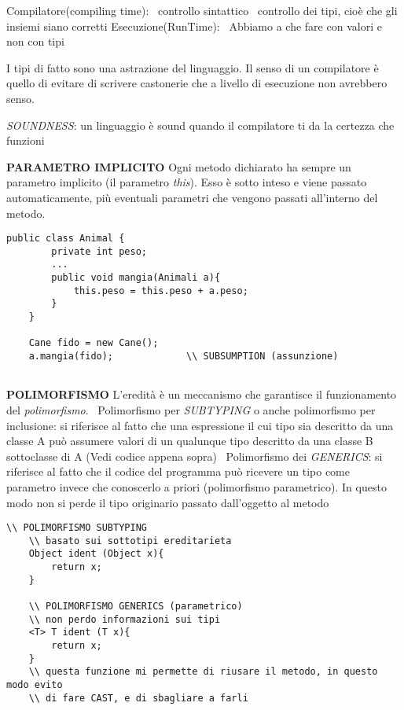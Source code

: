 \noindent Compilatore(compiling time): \newline
\textbullet\ controllo sintattico \newline
\textbullet\ controllo dei tipi, cioè che gli insiemi siano corretti \newline
Esecuzione(RunTime):\newline
\textbullet\ Abbiamo a che fare con valori e non con tipi

\noindent I tipi di fatto sono una astrazione del linguaggio. \newline
Il senso di un compilatore è quello di evitare di scrivere castonerie che a livello di esecuzione non avrebbero senso.

\noindent \textit{SOUNDNESS}: un linguaggio è sound quando il compilatore ti da la certezza che funzioni

\noindent \textbf{PARAMETRO IMPLICITO} \newline
 Ogni metodo dichiarato ha sempre un parametro implicito (il parametro \textit{this}). Esso è sotto inteso e viene passato automaticamente, più eventuali parametri che vengono passati all'interno del metodo.
\begin{lstlisting}[basicstyle=\small,]
	public class Animal {
		private int peso;
		...
		public void mangia(Animali a){
			this.peso = this.peso + a.peso;
		}
	}
	
	Cane fido = new Cane();
	a.mangia(fido); 			\\ SUBSUMPTION (assunzione)	
	
\end{lstlisting}

\noindent \textbf{POLIMORFISMO} \newline
L'eredità è un meccanismo che garantisce il funzionamento del \textit{polimorfismo}.\newline
\textbullet\ Polimorfismo per \textit{SUBTYPING} o anche polimorfismo per inclusione: si riferisce al fatto che una espressione il cui tipo sia descritto da una classe A può assumere valori di un qualunque tipo descritto da una classe B sottoclasse di A (Vedi codice appena sopra)\newline 
\textbullet\ Polimorfismo dei \textit{GENERICS}: si riferisce al fatto che il codice del programma può ricevere un tipo come parametro invece che conoscerlo a priori (polimorfismo parametrico). In questo modo non si perde il tipo originario passato dall'oggetto al metodo \newline
\begin{lstlisting}[basicstyle=\small,]
	\\ POLIMORFISMO SUBTYPING
	\\ basato sui sottotipi ereditarieta
	Object ident (Object x){
		return x;
	}

	\\ POLIMORFISMO GENERICS (parametrico)
	\\ non perdo informazioni sui tipi
	<T> T ident (T x){
		return x;
	}
	\\ questa funzione mi permette di riusare il metodo, in questo modo evito 
	\\ di fare CAST, e di sbagliare a farli

\end{lstlisting}

\newpage


